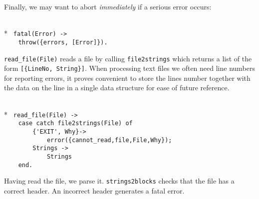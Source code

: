 Finally, we may want to abort {\sl immediately} if a serious error occurs:

\begin{flushleft}
\label{error handling_5_5}
\\*
\tt
\noindent{}%
\verb&fatal(Error) ->&\\
\noindent{}%
\verb&    throw({errors, [Error]}).&\\
\end{flushleft}

  \verb+read_file(File)+  reads a file  by calling \verb+file2strings+
which returns a list   of the form  \verb+[{LineNo, String}]+.   When
processing text files we often need line numbers for reporting errors,
it proves convenient to store the  lines number together with the data
on the line in a single data structure for ease of future reference.

\begin{flushleft}
\label{parsing_start}
\\*
\tt
\noindent{}%
\verb&read_file(File) ->&\\
\noindent{}%
\verb&    case catch file2strings(File) of&\\
\noindent{}%
\verb&        {'EXIT', Why}->&\\
\noindent{}%
\verb&            error({cannot_read,file,File,Why});&\\
\noindent{}%
\verb&        Strings ->&\\
\noindent{}%
\verb&            Strings&\\
\noindent{}%
\verb&    end.&\\
\end{flushleft}

  Having read the file, we parse it. \verb+strings2blocks+ checks that
the file has a correct header. An incorrect header generates a fatal
error.

